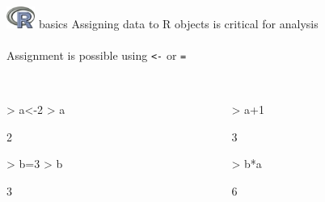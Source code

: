 \documentclass[xcolor=svgnames]{beamer}
\begin{document}
\begin{frame}[t,fragile]{\includegraphics[width=0.07\textwidth]{Rlogo.jpg} \hspace{0.01in} basics}
Assigning data to R objects is critical for analysis\\~\\
Assignment is possible using \textit{\texttt{<-}} or \textit{\texttt{=}}\\~\\
\begin{columns}[t]
\begin{column}{0.5\textwidth}
\begin{Schunk}
\begin{Sinput}
> a<-2
> a
\end{Sinput}
\begin{Soutput}
[1] 2
\end{Soutput}
\begin{Sinput}
> b=3
> b
\end{Sinput}
\begin{Soutput}
[1] 3
\end{Soutput}
\end{Schunk}
\end{column}
\begin{column}{0.5\textwidth}
\begin{Schunk}
\begin{Sinput}
> a+1
\end{Sinput}
\begin{Soutput}
[1] 3
\end{Soutput}
\begin{Sinput}
> b*a
\end{Sinput}
\begin{Soutput}
[1] 6
\end{Soutput}
\end{Schunk}
\end{column}
\end{columns}
\end{frame}
\end{document}
